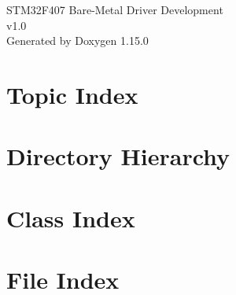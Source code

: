 \documentclass[twoside]{book}
\newcommand{\+}{\discretionary{\mbox{\scriptsize$\hookleftarrow$}}{}{}}
\newcommand{\clearemptydoublepage}{%
    \newpage{\pagestyle{empty}\cleardoublepage}%
  }
\begin{document}
  \raggedbottom
    \hypersetup{pageanchor=false,
                bookmarksnumbered=true,
                pdfencoding=unicode
               }
  \begin{titlepage}
  \vspace*{7cm}
  \begin{center}%
  {\Large STM32\+F407 Bare-\/\+Metal Driver Development}\\
  [1ex]\large v1.\+0 \\
  \vspace*{1cm}
  {\large Generated by Doxygen 1.15.0}\\
  \end{center}
  \end{titlepage}
  \clearemptydoublepage
  \tableofcontents
  \clearemptydoublepage
  \hypersetup{pageanchor=true}


\chapter{Topic Index}

\chapter{Directory Hierarchy}

\chapter{Class Index}

\chapter{File Index}

\end{document}
